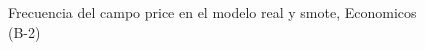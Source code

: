 \begin{figure}[H]
    \centering
    
    \caption{Frecuencia del campo  price en el modelo real y smote, Economicos (B-2)}
    \label{frecuency- Price-smote-enc}
\end{figure}